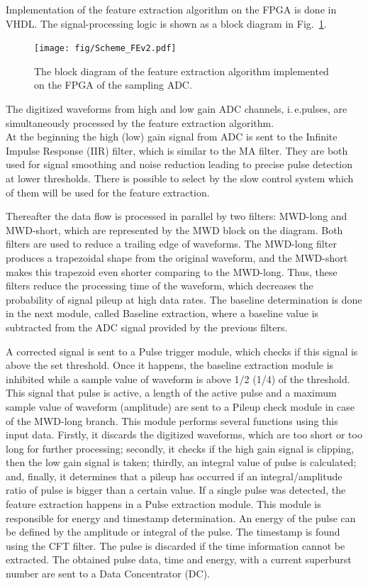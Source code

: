 \documentclass[12pt,a4paper, twocolumn]{article}
\newcommand{\Reffig}[1]{Fig.~\ref{#1}}
\begin{document}
Implementation of the feature extraction algorithm on the FPGA is done in VHDL. The signal-processing logic is shown as a block diagram in \Reffig{fig:fea_fwendcap}. 
\begin{figure}[h]
    \texttt{[image: fig/Scheme\_FEv2.pdf]}
    \caption[Scheme of the Feature Extraction Algorithm implemented on ADC]{
    The block diagram of the feature extraction algorithm implemented on the FPGA of the sampling ADC.}
    \label{fig:fea_fwendcap}
\end{figure}
The digitized waveforms from high and low gain ADC channels, i.\,e.\@ pulses, are simultaneously processed by the feature extraction algorithm. \\At the beginning the high (low) gain signal from ADC is sent to the Infinite Impulse Response (IIR) filter, which is similar to the MA filter. They are both used for signal smoothing and noise reduction leading to precise pulse detection at lower thresholds. There is possible to select by the slow control system which of them will be used for the feature extraction.

 Thereafter the data flow is processed in parallel by two filters: MWD-long and MWD-short, which are represented by the MWD block on the diagram. Both filters are used to reduce a trailing edge of waveforms. The MWD-long filter produces a trapezoidal shape from the original waveform, and the MWD-short makes this trapezoid even shorter comparing to the MWD-long. Thus, these filters  reduce the processing time of the waveform, which decreases the probability of signal pileup at high data rates. The baseline determination is done in the next module, called Baseline extraction, where a baseline value is subtracted from the ADC signal provided by the previous filters. 

A corrected signal is sent to a Pulse trigger module, which checks if this signal is above the set threshold. Once it happens, the baseline extraction module is inhibited while a sample value of waveform is above 1/2 (1/4) of the threshold. This signal that pulse is active, a length of the active pulse and a maximum sample value of waveform (amplitude) are sent to a Pileup check module in case of the MWD-long branch. This module performs several functions using this input data. Firstly, it discards the digitized waveforms, which are too short or too long for further processing; secondly, it checks if the high gain signal is clipping, then the low gain signal is taken; thirdly, an integral value of pulse is calculated; and, finally, it determines that a pileup has occurred if an integral/amplitude ratio of pulse is bigger than a certain value. If a single pulse was detected, the feature extraction happens in a Pulse extraction module. This module is responsible for energy and timestamp determination. An energy of the pulse can be defined by the amplitude or integral of the pulse. The timestamp is found using the CFT filter. The pulse is discarded if the time information cannot be extracted. The obtained pulse data, time and energy, with a current superburst number are sent to a Data Concentrator (DC). 
\end{document}
